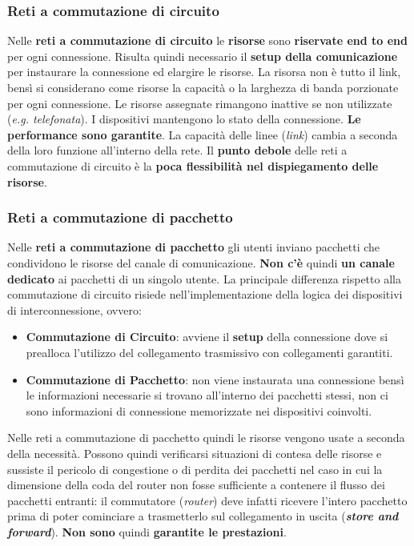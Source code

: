 \documentclass[11pt,a4paper,oneside]{book}
\theoremstyle{definition}
\begin{document}
\subsubsection{Reti a commutazione di circuito}
Nelle \textbf{reti a commutazione di circuito} le \textbf{risorse} sono \textbf{riservate end to end} per ogni connessione. Risulta quindi necessario il \textbf{setup della comunicazione} per instaurare la connessione ed elargire le risorse.\newline
La risorsa non è tutto il link, bensì si considerano come risorse la capacità o la larghezza di banda porzionate per ogni connessione. Le risorse assegnate rimangono inattive se non utilizzate (\textit{e.g. telefonata}). I dispositivi mantengono lo stato della connessione. \textbf{Le performance sono garantite}. La capacità delle linee (\textit{link}) cambia a seconda della loro funzione all'interno della rete. Il \textbf{punto debole} delle reti a commutazione di circuito è la \textbf{poca flessibilità nel dispiegamento delle risorse}.


\subsubsection{Reti a commutazione di pacchetto}
Nelle \textbf{reti a commutazione di pacchetto} gli utenti inviano pacchetti che condividono le risorse del canale di comunicazione. \textbf{Non c'è} quindi \textbf{un canale dedicato} ai pacchetti di un singolo utente. La principale differenza rispetto alla commutazione di circuito risiede nell'implementazione della logica dei dispositivi di interconnessione, ovvero:
\begin{itemize}
	\item \textbf{Commutazione di Circuito}: avviene il \textbf{setup} della connessione dove  si prealloca l’utilizzo del collegamento trasmissivo con collegamenti
	      garantiti.
	\item \textbf{Commutazione di Pacchetto}: non viene instaurata una connessione bensì le informazioni necessarie si trovano all'interno dei pacchetti stessi, non ci sono informazioni di connessione memorizzate nei dispositivi coinvolti.
\end{itemize}
Nelle reti a commutazione di pacchetto quindi le risorse vengono usate a seconda della necessità. Possono quindi verificarsi situazioni di contesa delle risorse e sussiste il pericolo di congestione o di perdita dei pacchetti nel caso in cui la dimensione della coda del router non fosse sufficiente a contenere il flusso dei pacchetti entranti: il commutatore (\textit{router}) deve infatti ricevere l’intero
pacchetto prima di poter cominciare a trasmetterlo sul collegamento in uscita (\textit{\textbf{store and forward}}). \textbf{Non sono} quindi \textbf{garantite le prestazioni}.
\end{document}
